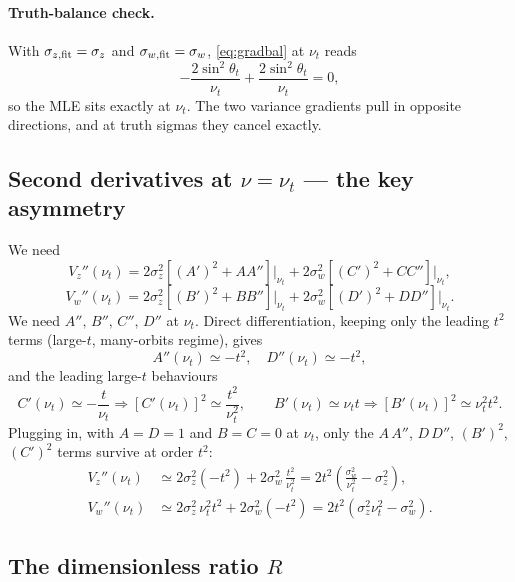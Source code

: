 \documentclass[11pt]{article}
\begin{document}
\paragraph{Truth-balance check.}
With $\sigma_{z,\rm fit}=\sigma_z$ and $\sigma_{w,\rm fit}=\sigma_w$,
\eqref{eq:gradbal} at $\nu_t$ reads
\begin{equation}
-\frac{2\sin^2\theta_t}{\nu_t} + \frac{2\sin^2\theta_t}{\nu_t} = 0,
\end{equation}
so the MLE sits exactly at $\nu_t$. The two variance gradients pull in opposite
directions, and at truth sigmas they cancel exactly.

\subsection{Second derivatives at $\nu=\nu_t$ — the key asymmetry}

We need
\begin{equation}
V_z''(\nu_t) = 2\sigma_z^2[(A')^2 + AA'']\big|_{\nu_t}
            + 2\sigma_w^2[(C')^2 + CC'']\big|_{\nu_t},
\end{equation}
\begin{equation}
V_w''(\nu_t) = 2\sigma_z^2[(B')^2 + BB'']\big|_{\nu_t}
            + 2\sigma_w^2[(D')^2 + DD'']\big|_{\nu_t}.
\end{equation}
We need $A'',\,B'',\,C'',\,D''$ at $\nu_t$. Direct differentiation, keeping only the
leading $t^2$ terms (large-$t$, many-orbits regime), gives
\begin{equation}
A''(\nu_t)\simeq -t^2,
\quad
D''(\nu_t)\simeq -t^2,
\end{equation}
and the leading large-$t$ behaviours
\begin{equation}
C'(\nu_t)\simeq -\frac{t}{\nu_t}\Rightarrow [C'(\nu_t)]^2 \simeq \frac{t^2}{\nu_t^2},
\qquad
B'(\nu_t)\simeq \nu_t t \Rightarrow [B'(\nu_t)]^2\simeq \nu_t^2 t^2.
\end{equation}
Plugging in, with $A=D=1$ and $B=C=0$ at $\nu_t$, only the $A\,A''$, $D\,D''$,
$(B')^2$, $(C')^2$ terms survive at order $t^2$:
\begin{align}
V_z''(\nu_t) &\simeq 2\sigma_z^2(-t^2) + 2\sigma_w^2\,\frac{t^2}{\nu_t^2}
= 2t^2\!\left(\frac{\sigma_w^2}{\nu_t^2} - \sigma_z^2\right),\\[4pt]
V_w''(\nu_t) &\simeq 2\sigma_z^2\,\nu_t^2 t^2 + 2\sigma_w^2(-t^2)
= 2t^2(\sigma_z^2\nu_t^2 - \sigma_w^2).
\end{align}

\subsection{The dimensionless ratio $R$}
\end{document}
